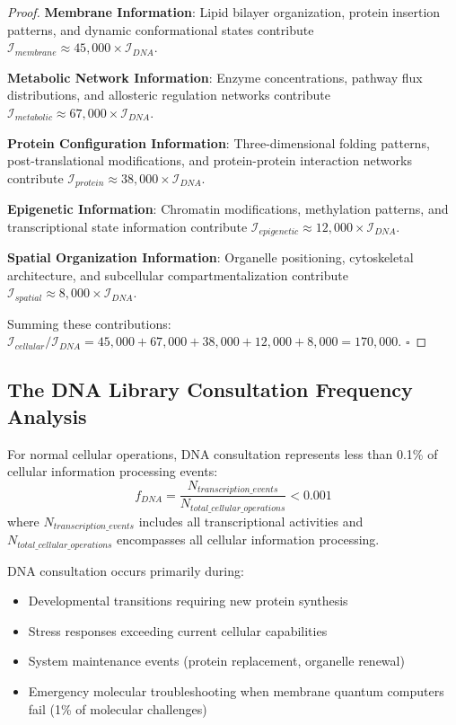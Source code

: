 \documentclass[11pt,a4paper]{article}
\begin{document}
\begin{proof}
\textbf{Membrane Information}: Lipid bilayer organization, protein insertion patterns, and dynamic conformational states contribute $\mathcal{I}_{membrane} \approx 45,000 \times \mathcal{I}_{DNA}$.

\textbf{Metabolic Network Information}: Enzyme concentrations, pathway flux distributions, and allosteric regulation networks contribute $\mathcal{I}_{metabolic} \approx 67,000 \times \mathcal{I}_{DNA}$.

\textbf{Protein Configuration Information}: Three-dimensional folding patterns, post-translational modifications, and protein-protein interaction networks contribute $\mathcal{I}_{protein} \approx 38,000 \times \mathcal{I}_{DNA}$.

\textbf{Epigenetic Information}: Chromatin modifications, methylation patterns, and transcriptional state information contribute $\mathcal{I}_{epigenetic} \approx 12,000 \times \mathcal{I}_{DNA}$.

\textbf{Spatial Organization Information}: Organelle positioning, cytoskeletal architecture, and subcellular compartmentalization contribute $\mathcal{I}_{spatial} \approx 8,000 \times \mathcal{I}_{DNA}$.

Summing these contributions: $\mathcal{I}_{cellular}/\mathcal{I}_{DNA} = 45,000 + 67,000 + 38,000 + 12,000 + 8,000 = 170,000$. $\square$
\end{proof}

\subsection{The DNA Library Consultation Frequency Analysis}

\begin{definition}
For normal cellular operations, DNA consultation represents less than 0.1\% of cellular information processing events:
\begin{equation}
f_{DNA} = \frac{N_{transcription\_events}}{N_{total\_cellular\_operations}} < 0.001
\end{equation}
where $N_{transcription\_events}$ includes all transcriptional activities and $N_{total\_cellular\_operations}$ encompasses all cellular information processing.
\end{definition}

DNA consultation occurs primarily during:
\begin{itemize}
\item Developmental transitions requiring new protein synthesis
\item Stress responses exceeding current cellular capabilities
\item System maintenance events (protein replacement, organelle renewal)
\item Emergency molecular troubleshooting when membrane quantum computers fail (1\% of molecular challenges)
\end{itemize}
\end{document}
